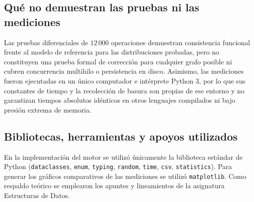 \documentclass[11pt,a4paper]{article}
\begin{document}
\subsection{Qué no demuestran las pruebas ni las mediciones}
Las pruebas diferenciales de $12\,000$ operaciones demuestran consistencia funcional frente al modelo de referencia para las distribuciones probadas, pero no constituyen una prueba formal de corrección para cualquier grafo posible ni cubren concurrencia multihilo o persistencia en disco. Asimismo, las mediciones fueron ejecutadas en un único computador e intérprete Python 3, por lo que sus constantes de tiempo y la recolección de basura son propias de ese entorno y no garantizan tiempos absolutos idénticos en otros lenguajes compilados ni bajo presión extrema de memoria.

\subsection{Bibliotecas, herramientas y apoyos utilizados}
En la implementación del motor se utilizó únicamente la biblioteca estándar de Python (\texttt{dataclasses}, \texttt{enum}, \texttt{typing}, \texttt{random}, \texttt{time}, \texttt{csv}, \texttt{statistics}). Para generar los gráficos comparativos de las mediciones se utilizó \texttt{matplotlib}. Como respaldo teórico se emplearon los apuntes y lineamientos de la asignatura Estructuras de Datos.
\end{document}
